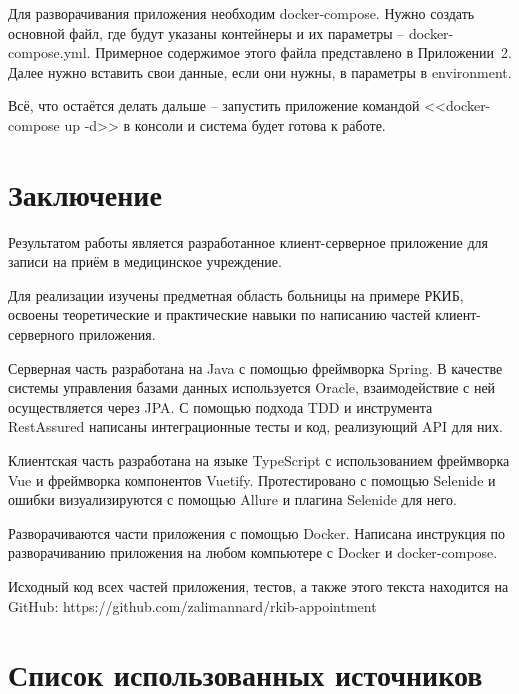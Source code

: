 \documentclass[a4paper,article]{article}
\begin{document}
\begin{sloppypar}
    Для разворачивания приложения необходим docker-compose. Нужно создать основной файл, где будут указаны контейнеры и их параметры -- docker-compose.yml. Примерное содержимое этого файла представлено в Приложении~2. Далее нужно вставить свои данные, если они нужны, в параметры в environment.
    
    Всё, что остаётся делать дальше -- запустить приложение командой <<docker-compose up -d>> в консоли и система будет готова к работе.

    \newpage

    \section*{Заключение}
    
    Результатом работы является разработанное клиент-серверное приложение для записи на приём в медицинское учреждение.
    
    Для реализации изучены предметная область больницы на примере РКИБ, освоены теоретические и практические навыки по написанию частей клиент-серверного приложения. 
    
    Серверная часть разработана на Java с помощью фреймворка Spring. В качестве системы управления базами данных используется Oracle, взаимодействие с ней осуществляется через JPA. С помощью подхода TDD и инструмента RestAssured написаны интеграционные тесты и код, реализующий API для них.
    
    Клиентская часть разработана на языке TypeScript с использованием фреймворка Vue и фреймворка компонентов Vuetify. Протестировано с помощью Selenide и ошибки визуализируются с помощью Allure и плагина Selenide для него.
    
    Разворачиваются части приложения с помощью Docker. Написана инструкция по разворачиванию приложения на любом компьютере с Docker и docker-compose.
    
    Исходный код всех частей приложения, тестов, а также этого текста находится на GitHub: https://github.com/zalimannard/rkib-appointment

    \newpage

    \section*{Список использованных источников}

    \begin{enumerate}[leftmargin=*, itemindent=\labelwidth]
        

\end{enumerate}
\end{sloppypar}
\end{document}
